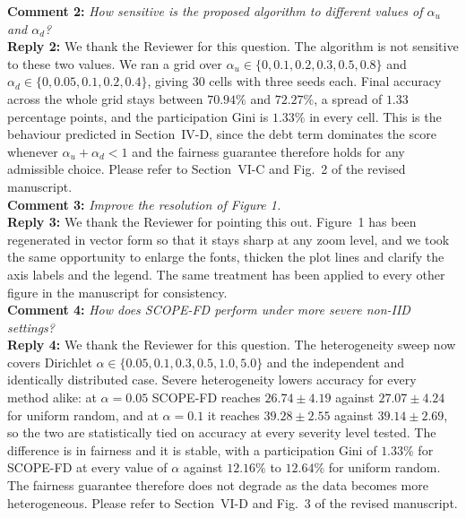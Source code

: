 \documentclass[10pt]{article}
\begin{document}
\noindent
\textbf{Comment 2:} \textit{How sensitive is the proposed algorithm to different values of $\alpha_u$ and $\alpha_d$?} \\
\noindent
\textbf{Reply 2:} {We thank the Reviewer for this question. The algorithm is not sensitive to these two values. We ran a grid over $\alpha_u \in \{0, 0.1, 0.2, 0.3, 0.5, 0.8\}$ and $\alpha_d \in \{0, 0.05, 0.1, 0.2, 0.4\}$, giving $30$ cells with three seeds each. Final accuracy across the whole grid stays between $70.94\%$ and $72.27\%$, a spread of $1.33$ percentage points, and the participation Gini is $1.33\%$ in every cell. This is the behaviour predicted in Section~IV-D, since the debt term dominates the score whenever $\alpha_u + \alpha_d < 1$ and the fairness guarantee therefore holds for any admissible choice. Please refer to Section~VI-C and Fig.~2 of the revised manuscript.}\\

\noindent
\textbf{Comment 3:} \textit{Improve the resolution of Figure 1.} \\
\noindent
\textbf{Reply 3:} {We thank the Reviewer for pointing this out. Figure~1 has been regenerated in vector form so that it stays sharp at any zoom level, and we took the same opportunity to enlarge the fonts, thicken the plot lines and clarify the axis labels and the legend. The same treatment has been applied to every other figure in the manuscript for consistency.}\\

\noindent
\textbf{Comment 4:} \textit{How does SCOPE-FD perform under more severe non-IID settings?} \\
\noindent
\textbf{Reply 4:} {We thank the Reviewer for this question. The heterogeneity sweep now covers Dirichlet $\alpha \in \{0.05, 0.1, 0.3, 0.5, 1.0, 5.0\}$ and the independent and identically distributed case. Severe heterogeneity lowers accuracy for every method alike: at $\alpha = 0.05$ SCOPE-FD reaches $26.74 \pm 4.19$ against $27.07 \pm 4.24$ for uniform random, and at $\alpha = 0.1$ it reaches $39.28 \pm 2.55$ against $39.14 \pm 2.69$, so the two are statistically tied on accuracy at every severity level tested. The difference is in fairness and it is stable, with a participation Gini of $1.33\%$ for SCOPE-FD at every value of $\alpha$ against $12.16\%$ to $12.64\%$ for uniform random. The fairness guarantee therefore does not degrade as the data becomes more heterogeneous. Please refer to Section~VI-D and Fig.~3 of the revised manuscript.}\\
\end{document}
